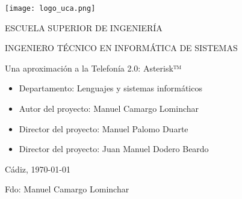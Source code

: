 
\begin{center}

  \texttt{[image: logo\_uca.png]} 

  \vspace{2.0cm}

  \Large{ESCUELA SUPERIOR DE INGENIERÍA} 

  \vspace{1.0cm}

  \large{INGENIERO TÉCNICO EN INFORMÁTICA DE SISTEMAS} 

  \vspace{2.0cm}

  \large{Una aproximación a la Telefonía 2.0: Asterisk™} 

  \vspace{1.0cm}

\end{center}

\begin{itemize} 
\item \large{Departamento: Lenguajes y sistemas informáticos}
\item \large{Autor del proyecto: Manuel Camargo Lominchar}
\item \large{Director del proyecto: Manuel Palomo Duarte}
\item \large{Director del proyecto: Juan Manuel Dodero Beardo}
\end{itemize}

\vspace{1.0cm}

\begin{flushright}
  \large{Cádiz, \today} 

  \vspace{3.5cm}

  \large{Fdo: Manuel Camargo Lominchar}
\end{flushright}
